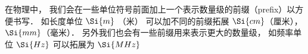 
在物理中， 我们会在一些单位符号前面加上一个表示数量级的前缀（prefix）以方便书写． 如长度单位 $\Si{m}$ （米） 可以加不同的前缀拓展 $\Si{cm}$（厘米）， $\Si{mm}$（毫米）． 另外我们也会有一些前缀用来表示更大的数量级， 如频率单位 $\Si{Hz}$ 可以拓展为 $\Si{MHz}$
